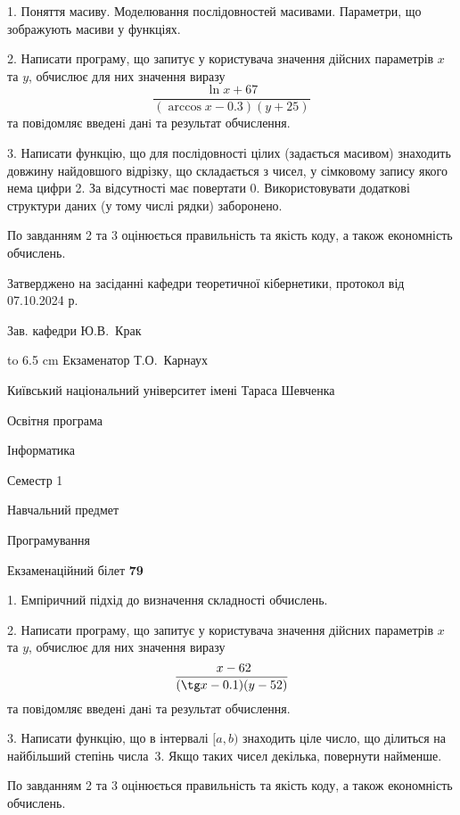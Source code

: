 \documentclass[12pt, ukrainian]{article}
\begin{document}
{%
1. Поняття масиву. Моделювання послідовностей масивами. Параметри, що зображують масиви у функціях.%
\par
2. Написати програму, що запитує у користувача значення дійсних параметрів $x$ та $y$, обчислює для них значення виразу 
$$\frac{\ln x + 67}{(\arccos x - 0.3) (y + 25)}$$ 
та повiдомляє введенi данi та результат обчислення.

\par
3. Написати функцію, що для послідовності цілих (задається масивом) знаходить довжину найдовшого відрізку, що складається з чисел, у сімковому запису якого нема цифри 2. За відсутності має повертати $0$. Використовувати додаткові структури даних (у тому числі рядки) заборонено.

По завданням 2 та 3 оцінюється правильність та якість коду, а також економність обчислень.

}
{\smallskip\smallskip \begin {scriptsize} Затверджено на засіданні кафедри теоретичної кібернетики, протокол   від   07.10.2024 р.\par\smallskip\smallskip\smallskip\smallskip
{\parbox {6.5 cm} {Зав. кафедри \dotfill Ю.В.~Крак}}\hspace {0.7cm} {\hbox to 6.5 cm { Екзаменатор \dotfill Т.О.~Карнаух}} \end{scriptsize}}
\newpage
{{\begin {scriptsize}\par
{ \center  Київський національний університет імені Тараса Шевченка \par}
{\parbox {5 cm}{Освітня програма \hfill}{\parbox {7 cm}{Інформатика\hfill}}\parbox {6 cm}{\hfill Семестр 1}}\par
{\parbox {5 cm} {Навчальний предмет \hfill}\parbox {7 cm}{Програмування \hfill}\parbox {6cm}{\hfill}\par}\vspace{-15pt} \end{scriptsize}}{\center Екзаменаційний білет \No \textbf { 79 }\par}}
{%
1. Емпіричний підхід до визначення складності обчислень.%
\par
2. Написати програму, що запитує у користувача значення дійсних параметрів $x$ та $y$, обчислює для них значення виразу 
$$\frac{\ x - 62}{(\tg x - 0.1) (y - 52)}$$ 
та повiдомляє введенi данi та результат обчислення.

\par
3. Написати функцію, що в інтервалі $[a, b)$ знаходить ціле число, що ділиться на найбільший степінь числа 3. Якщо таких чисел декілька, повернути найменше.

По завданням 2 та 3 оцінюється правильність та якість коду, а також економність обчислень.

}
\end{document}
